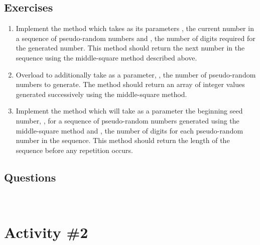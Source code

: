 	  \subsection{Exercises}
	    \begin{enumerate}
	      \item Implement the  method which takes as its parameters , the current number in a sequence of pseudo-random numbers and , the number of digits required for the generated number. This method should return the next number in the sequence using the middle-square method described above.
	      \item Overload  to additionally take as a parameter, , the number of pseudo-random numbers to generate. The method should return an array of integer values generated successively using the middle-square method.
	      \item Implement the  method which will take as a parameter the beginning seed number, , for a sequence of pseudo-random numbers generated using the middle-square method and , the number of digits for each pseudo-random number in the sequence. This method should return the length of the sequence before any repetition occurs.
	    \end{enumerate}

  \pagebreak

	  \subsection{Questions}
	    \ \\[9pt]

  \pagebreak

	\section{Activity \#2}
